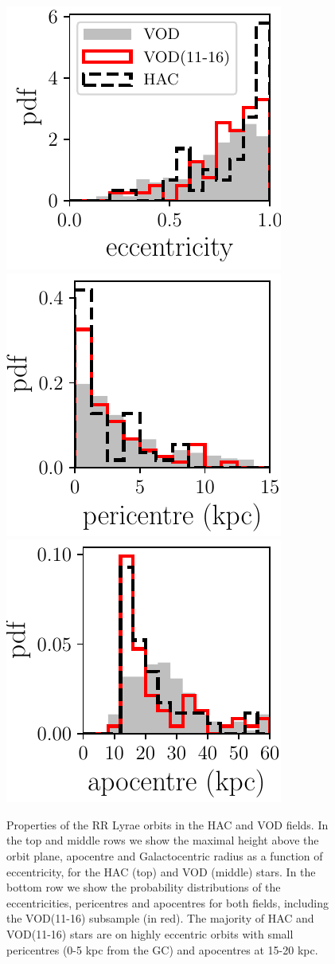 \documentclass[fleqn,usenatbib]{mnras}
\begin{document}
\begin{figure}
              \includegraphics[scale=0.473]{eccentricities.pdf} 
    \includegraphics[scale=0.473]{pericentres.pdf} 
                          \includegraphics[scale=0.473]{apocentres.pdf} 
\vspace{-0.45cm}
  \caption{Properties of the RR Lyrae orbits in the HAC and VOD fields. In the top and middle rows we show the maximal height above the orbit plane, apocentre and Galactocentric radius as a function of eccentricity, for the HAC (top) and VOD (middle) stars. In the bottom row we show the probability distributions of the eccentricities, pericentres and apocentres for both fields, including the VOD(11-16) subsample (in red). The majority of HAC and VOD(11-16) stars are on highly eccentric orbits with small pericentres (0-5 kpc from the GC) and apocentres at 15-20 kpc.}
    \label{fig:orbits}   
    \end{figure}
\end{document}
